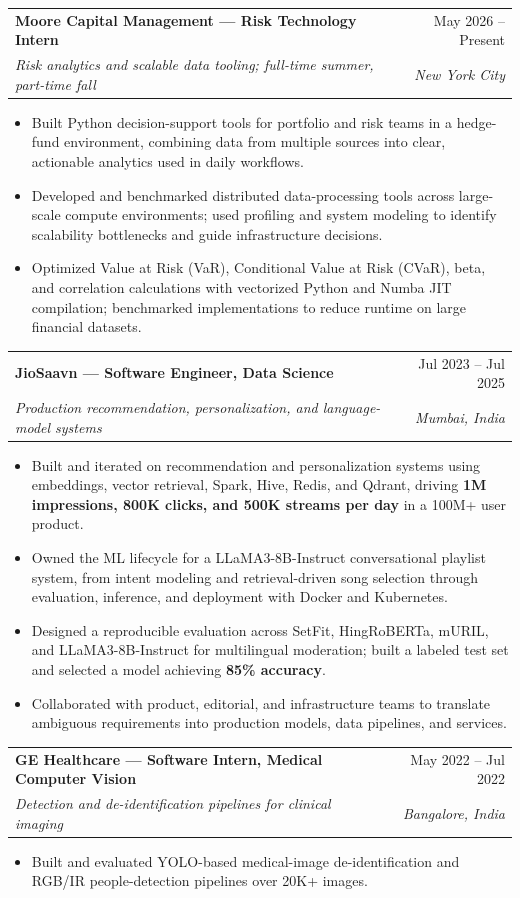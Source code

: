 \documentclass[10pt,letterpaper]{article}
\makeatletter
\newcommand{\entry}[4]{%
  \begin{tabularx}{\textwidth}{@{}Xr@{}}
    \textbf{#1} & #2 \\
    \textit{#3} & \textit{#4}
  \end{tabularx}\vspace{-0.2em}
}
\makeatother
\begin{document}
\entry{Moore Capital Management --- Risk Technology Intern}{May 2026 -- Present}{Risk analytics and scalable data tooling; full-time summer, part-time fall}{New York City}
\begin{itemize}
  \item Built Python decision-support tools for portfolio and risk teams in a hedge-fund environment, combining data from multiple sources into clear, actionable analytics used in daily workflows.
  \item Developed and benchmarked distributed data-processing tools across large-scale compute environments; used profiling and system modeling to identify scalability bottlenecks and guide infrastructure decisions.
  \item Optimized Value at Risk (VaR), Conditional Value at Risk (CVaR), beta, and correlation calculations with vectorized Python and Numba JIT compilation; benchmarked implementations to reduce runtime on large financial datasets.
\end{itemize}

\vspace{0.5em}
\entry{JioSaavn --- Software Engineer, Data Science}{Jul 2023 -- Jul 2025}{Production recommendation, personalization, and language-model systems}{Mumbai, India}
\begin{itemize}
  \item Built and iterated on recommendation and personalization systems using embeddings, vector retrieval, Spark, Hive, Redis, and Qdrant, driving \textbf{1M impressions, 800K clicks, and 500K streams per day} in a 100M+ user product.
  \item Owned the ML lifecycle for a LLaMA3-8B-Instruct conversational playlist system, from intent modeling and retrieval-driven song selection through evaluation, inference, and deployment with Docker and Kubernetes.
  \item Designed a reproducible evaluation across SetFit, HingRoBERTa, mURIL, and LLaMA3-8B-Instruct for multilingual moderation; built a labeled test set and selected a model achieving \textbf{85\% accuracy}.
  \item Collaborated with product, editorial, and infrastructure teams to translate ambiguous requirements into production models, data pipelines, and services.
\end{itemize}

\vspace{0.5em}
\entry{GE Healthcare --- Software Intern, Medical Computer Vision}{May 2022 -- Jul 2022}{Detection and de-identification pipelines for clinical imaging}{Bangalore, India}
\begin{itemize}
  \item Built and evaluated YOLO-based medical-image de-identification and RGB/IR people-detection pipelines over 20K+ images.
\end{itemize}
\end{document}
